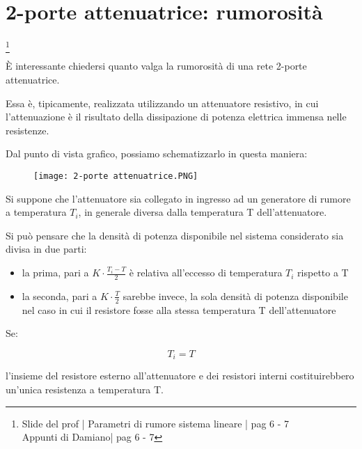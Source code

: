 \newpage 

\section{2-porte attenuatrice: rumorosità}
\footnote{Slide del prof | Parametri di rumore sistema lineare | pag 6 - 7\\  
Appunti di Damiano| pag 6 - 7} 

È interessante chiedersi quanto valga la rumorosità di una rete 2-porte attenuatrice. \newline 

Essa è, tipicamente, realizzata utilizzando un attenuatore resistivo, 
in cui l'attenuazione è il risultato della dissipazione di potenza elettrica immensa nelle resistenze. \newline 

Dal punto di vista grafico, possiamo schematizzarlo in questa maniera: 

\begin{figure}[h]
    \centering
    \texttt{[image: 2-porte attenuatrice.PNG]}
\end{figure}

Si suppone che l'attenuatore sia collegato in ingresso ad un generatore di rumore a temperatura $T_i$, 
in generale diversa dalla temperatura T dell'attenuatore. \newline 

Si può pensare che la densità di potenza disponibile nel sistema considerato sia divisa in due parti: 

\begin{itemize}
    \item la prima, pari a $K \cdot \frac{T_i - T}{2}$ è relativa all'eccesso di temperatura $T_i$ rispetto a T 
    \item la seconda, pari a $K \cdot \frac{T}{2}$ sarebbe invece, la sola densità di potenza disponibile nel caso in cui il resistore fosse alla stessa temperatura T dell'attenuatore
\end{itemize}

Se: 

{
    \Large 
    \begin{equation}
        T_i = T
    \end{equation}
}

l'insieme del resistore esterno all'attenuatore e dei resistori interni costituirebbero un'unica resistenza a temperatura T. \newline 

